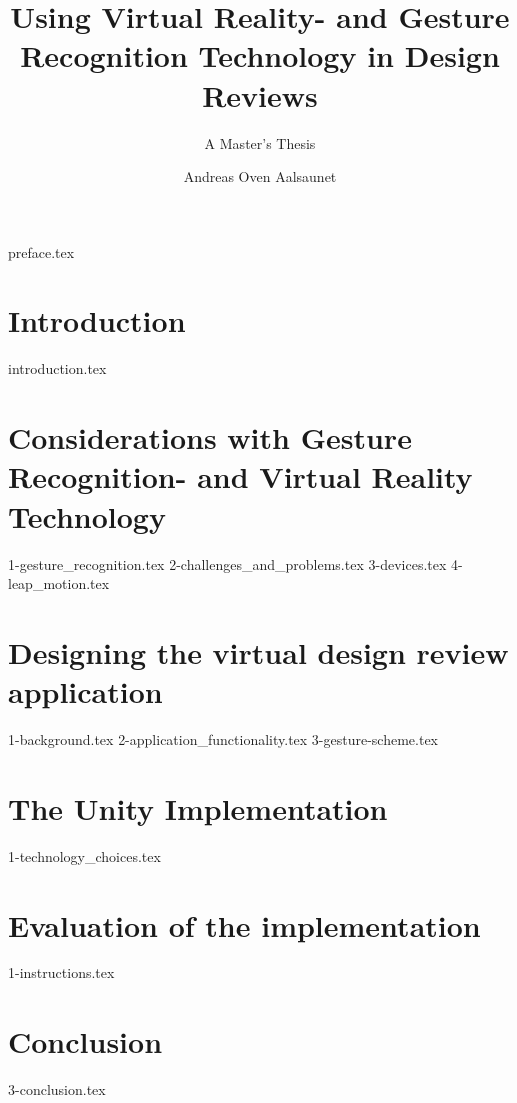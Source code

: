 \documentclass[UKenglish]{ifimaster}
\title{Using Virtual Reality- and Gesture Recognition Technology in Design Reviews}
\subtitle{A Master's Thesis}
\author{Andreas Oven Aalsaunet}
\begin{document}
\duoforside[dept={Department of Informatics}, program={Programming and Networks}, long]                                        

{preface.tex}

\frontmatter{}                 
\tableofcontents{}
\listoffigures{}
\listoftables{}

\mainmatter{}
\chapter{Introduction}  
{introduction.tex}

\chapter{Considerations with Gesture Recognition- and Virtual Reality Technology}
{1-gesture_recognition.tex}
{2-challenges_and_problems.tex}
{3-devices.tex}
{4-leap_motion.tex}




\chapter{Designing the virtual design review application}
{1-background.tex}
{2-application_functionality.tex}
{3-gesture-scheme.tex}

\chapter{The Unity Implementation}
{1-technology_choices.tex}

\chapter{Evaluation of the implementation}
{1-instructions.tex}

\chapter{Conclusion}
{3-conclusion.tex}

\backmatter{}


\end{document}
